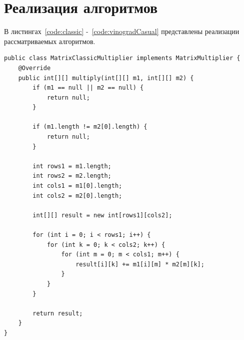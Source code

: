 \documentclass[12pt]{report}
\begin{document}
    \section{Реализация алгоритмов}
    В листингах~\ref{code:classic} -~\ref{code:vinogradCasual} представлены
    реализации рассматриваемых алгоритмов.

    \begin{lstlisting}[caption=Классический алгоритм, label={code:classic}]
public class MatrixClassicMultiplier implements MatrixMultiplier {
    @Override
    public int[][] multiply(int[][] m1, int[][] m2) {
        if (m1 == null || m2 == null) {
            return null;
        }

        if (m1.length != m2[0].length) {
            return null;
        }

        int rows1 = m1.length;
        int rows2 = m2.length;
        int cols1 = m1[0].length;
        int cols2 = m2[0].length;

        int[][] result = new int[rows1][cols2];

        for (int i = 0; i < rows1; i++) {
            for (int k = 0; k < cols2; k++) {
                for (int m = 0; m < cols1; m++) {
                    result[i][k] += m1[i][m] * m2[m][k];
                }
            }
        }

        return result;
    }
}
    \end{lstlisting}
\end{document}

